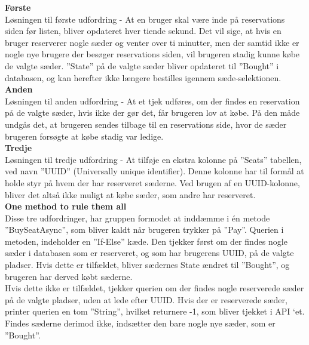 \textbf{Første}\\
Løsningen til første udfordring - At en bruger skal være inde på 
reservations siden før listen, bliver opdateret hver tiende sekund. 
Det vil sige, at hvis en bruger reserverer nogle sæder og venter over ti 
minutter, men der samtid ikke er nogle nye brugere der besøger reservations 
siden, vil brugeren stadig kunne købe de valgte sæder. ”State” på de valgte 
sæder bliver opdateret til ”Bought” i databasen, og kan herefter ikke længere 
bestilles igennem sæde-selektionen.\\ 

\textbf{Anden}\\
Løsningen til anden udfordring - At et tjek udføres, om der findes en reservation på de valgte 
sæder, hvis ikke der gør det, får brugeren lov at købe. På den måde undgås det, 
at brugeren sendes tilbage til en reservations side, hvor de sæder brugeren 
forsøgte at købe stadig var ledige.\\

\textbf{Tredje}\\
Løsningen til tredje udfordring - At tilføje en ekstra kolonne på ”Seats” tabellen, ved navn 
”UUID” (Universally unique identifier). Denne kolonne har til formål at holde 
styr på hvem der har reserveret sæderne. Ved brugen af en UUID-kolonne, 
bliver det altså ikke muligt at købe sæder, som andre har reserveret.\\  

\textbf{One method to rule them all}\\
Disse tre udfordringer, har gruppen formodet at inddæmme i én metode 
”BuySeatAsync”, som bliver kaldt når brugeren trykker på ”Pay”. 
Querien i metoden, indeholder en ”If-Else” kæde. Den tjekker først om der 
findes nogle sæder i databasen som er reserveret, og som har brugerens UUID, 
på de valgte pladser. Hvis dette er tilfældet, bliver sædernes State ændret til 
”Bought”, og brugeren har derved købt sæderne.\\ 

Hvis dette ikke er tilfældet, tjekker querien om der findes nogle reserverede 
sæder på de valgte pladser, uden at lede efter UUID. Hvis der er reserverede 
sæder, printer querien en tom ”String”, hvilket returnere -1, som bliver 
tjekket i API ‘et. Findes sæderne derimod ikke, indsætter den bare nogle nye 
sæder, som er ”Bought”. 

